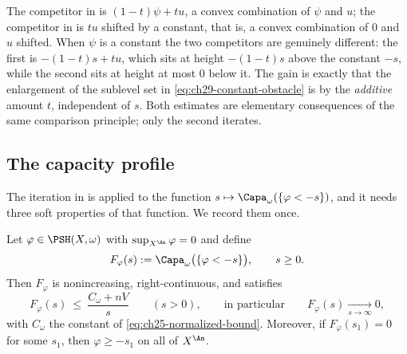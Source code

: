 \begin{remark}
\label{rem:ch29-two-obstacle-forms}
The competitor in  is
\((1-t)\psi+tu\), a convex combination of \(\psi\) and \(u\); the competitor
in  is \(tu\) shifted by a constant, that
is, a convex combination of \(0\) and \(u\) shifted.  When \(\psi\) is a
constant the two competitors are genuinely different: the first is
\(-(1-t)s+tu\), which sits at height \(-(1-t)s\) above the constant \(-s\),
while the second sits at height at most \(0\) below it.  The gain is exactly
that the enlargement of the sublevel set in
\eqref{eq:ch29-constant-obstacle} is by the \emph{additive} amount \(t\),
independent of \(s\).  Both estimates are elementary consequences of the
same comparison principle; only the second iterates.
\end{remark}

\subsection{The capacity profile}
\label{sec:ch29-profile}

The iteration in  is applied to the function
\(s\mapsto\Capa_\omega(\{\varphi<-s\})\), and it needs three soft properties
of that function.  We record them once.

\begin{lemma}
\label{lem:ch29-capacity-profile}
Let \(\varphi\in\PSH(X,\omega)\) with \(\sup_{X^{\An}}\varphi=0\) and define
\begin{equation}
\label{eq:ch29-profile}
 F_\varphi(s):=\Capa_\omega\bigl(\{\varphi<-s\}\bigr),
 \qquad s\geq0 .
\end{equation}
Then \(F_\varphi\) is nonincreasing, right-continuous, and satisfies
\begin{equation}
\label{eq:ch29-profile-decay}
 F_\varphi(s)\ \leq\ \frac{C_\omega+nV}{s}\qquad(s>0),
 \qquad\text{in particular}\qquad F_\varphi(s)\xrightarrow[s\to\infty]{}0,
\end{equation}
with \(C_\omega\) the constant of \eqref{eq:ch25-normalized-bound}.
Moreover, if \(F_\varphi(s_1)=0\) for some \(s_1\), then
\(\varphi\geq-s_1\) on all of \(X^{\An}\).
\end{lemma}


